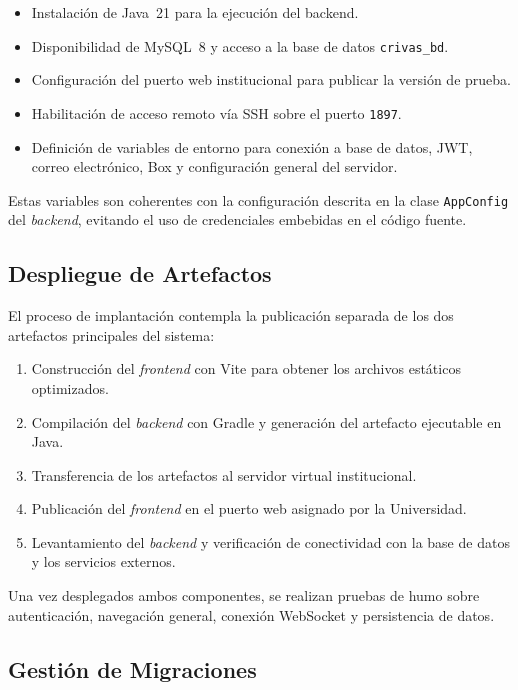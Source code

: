 \begin{itemize}
    \item Instalación de Java~21 para la ejecución del backend.
    \item Disponibilidad de MySQL~8 y acceso a la base de datos \texttt{crivas\_bd}.
    \item Configuración del puerto web institucional para publicar la versión de prueba.
    \item Habilitación de acceso remoto vía SSH sobre el puerto \texttt{1897}.
    \item Definición de variables de entorno para conexión a base de datos, JWT, correo electrónico, Box y configuración general del servidor.
\end{itemize}

Estas variables son coherentes con la configuración descrita en la clase \texttt{AppConfig} del \textit{backend}, evitando el uso de credenciales embebidas en el código fuente.

\subsection{Despliegue de Artefactos}

El proceso de implantación contempla la publicación separada de los dos artefactos principales del sistema:

\begin{enumerate}
    \item Construcción del \textit{frontend} con Vite para obtener los archivos estáticos optimizados.
    \item Compilación del \textit{backend} con Gradle y generación del artefacto ejecutable en Java.
    \item Transferencia de los artefactos al servidor virtual institucional.
    \item Publicación del \textit{frontend} en el puerto web asignado por la Universidad.
    \item Levantamiento del \textit{backend} y verificación de conectividad con la base de datos y los servicios externos.
\end{enumerate}

Una vez desplegados ambos componentes, se realizan pruebas de humo sobre autenticación, navegación general, conexión WebSocket y persistencia de datos.

\subsection{Gestión de Migraciones}


